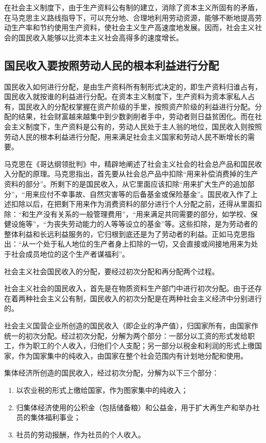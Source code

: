 \documentclass{book}
\begin{document}
在社会主义制度下，由于生产资料公有制的建立，消除了资本主义所固有的矛盾，在马克思主义路线指导下，可以充分地、合理地利用劳动资源，能够不断地提高劳动生产率和节约使用生产资料，使社会主义生产高速度地发展。因而，社会主义社会的国民收入能够以比资本主义社会高得多的速度增长。

\subsection{国民收入要按照劳动人民的根本利益进行分配}

国民收入如何进行分配，是由生产资料所有制形式决定的，即生产资料归谁占有，国民收入就按谁的利益进行分配。在资本主义制度下，生产资料为资本家私人占有，国民收入的分配权掌握在资产阶级的手里，按照资产阶级的利益进行分配。分配的结果，社会财富越来越集中到少数剥削者手中，劳动者则日益贫困化。而在社会主义制度下，生产资料是公有的，劳动人民处于主人翁的地位，国民收入则按照劳动人民的根本利益进行分配，用来满足社会主义国家和劳动人民不断增长的需要。

马克思在《哥达纲领批判》中，精辟地阐述了社会主义社会的社会总产品和国民收入分配的原理。马克思指出，首先要从社会总产品中扣除“用来补偿消费掉的生产资料的部分”。所剩下的是国民收入，从它里面应该扣除“用来扩大生产的追加部分”，“用来应付不幸事故、自然灾害等的后备基金或保险基金”。国民收入作了上述扣除以后，在把剩下用来作为消费资料的部分进行个人分配之前，还得从里面扣除：“和生产没有关系的一般管理费用”，“用来满足共同需要的部分，如学校、保健设施等”，“为丧失劳动能力的人等等设立的基金”等。这些扣除，是为劳动者的整体利益和长远利益服务的，它归根到底还是为了劳动者的利益。正如马克思指出：“从一个处于私人地位的生产者身上扣除的一切，又会直接或间接地用来为处于社会成员地位的这个生产者谋福利”。

社会主义社会国民收入的分配，要经过初次分配和再分配两个过程。

社会主义社会的国民收入，首先是在物质资料生产部门中进行初次分配。由于还存在着两种社会主义公有制，国民收入的初次分配是在两种社会主义经济中分别进行的。

社会主义国营企业所创造的国民收入（即企业的净产值），归国家所有，由国家作统一的初次分配。经过初次分配，分解为两个部分：一部分以工资的形式发给职工，作为职工的个人收入，归他们个人支配；另一部分以税金和利润的形式上缴国家，作为国家集中的纯收入，由国家在整个社会范围内有计划地分配和使用。

集体经济所创造的国民收入，经过初次分配，分解为以下三个部分：

  \begin{enumerate}

\item 以农业税的形式上缴给国家，作为图家集中的纯收入；
\item 归集体经济使用的公积金（包括储备粮）和公益金，用于扩大再生产和举办社员的集体福利事业；
\item 社员的劳动报酬，作为社员的个人收入。

    \end{enumerate}
    
\end{document}
